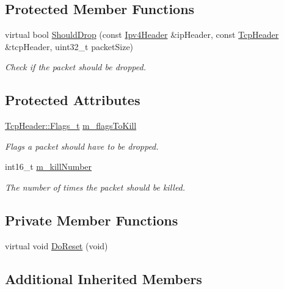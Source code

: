 \subsection*{Protected Member Functions}
\begin{DoxyCompactItemize}
\item 
virtual bool \hyperlink{classns3_1_1TcpFlagErrorModel_a078b078644aa6ea2527956fb99a84916}{Should\+Drop} (const \hyperlink{classns3_1_1Ipv4Header}{Ipv4\+Header} \&ip\+Header, const \hyperlink{classns3_1_1TcpHeader}{Tcp\+Header} \&tcp\+Header, uint32\+\_\+t packet\+Size)
\begin{DoxyCompactList}\small\item\em Check if the packet should be dropped. \end{DoxyCompactList}\end{DoxyCompactItemize}
\subsection*{Protected Attributes}
\begin{DoxyCompactItemize}
\item 
\hyperlink{classns3_1_1TcpHeader_a5f3d432941327854b5ad621e467479c6}{Tcp\+Header\+::\+Flags\+\_\+t} \hyperlink{classns3_1_1TcpFlagErrorModel_a153c832e564ee9d42c2a4f8adbdac406}{m\+\_\+flags\+To\+Kill}
\begin{DoxyCompactList}\small\item\em Flags a packet should have to be dropped. \end{DoxyCompactList}\item 
int16\+\_\+t \hyperlink{classns3_1_1TcpFlagErrorModel_adc3115afebce5f5e0027b5dbb22b9a6b}{m\+\_\+kill\+Number}
\begin{DoxyCompactList}\small\item\em The number of times the packet should be killed. \end{DoxyCompactList}\end{DoxyCompactItemize}
\subsection*{Private Member Functions}
\begin{DoxyCompactItemize}
\item 
virtual void \hyperlink{classns3_1_1TcpFlagErrorModel_a1764dc165b83554424f1d5e5ddfa1bb2}{Do\+Reset} (void)
\end{DoxyCompactItemize}
\subsection*{Additional Inherited Members}



